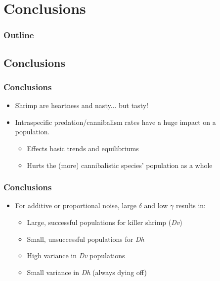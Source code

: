 \section{Conclusions}


\begin{frame}
  \frametitle{Outline}
  \tableofcontents[ currentsection ]
\end{frame}

\subsection{Conclusions}

\begin{frame}
  \frametitle{Conclusions}
\vfill
\begin{itemize}
	\item Shrimp are heartness and nasty... but tasty!
			\vfill
	\item Intraspecific predation/cannibalism rates have a huge impact on a population.
			\vfill
	\begin{itemize}
		\item Effects basic trends and equilibriums
			\vfill
		\item Hurts the (more) cannibalistic species' population as a whole
	\end{itemize}
			\vfill
\end{itemize}
  
\end{frame}

\begin{frame}
  \frametitle{Conclusions}
\vfill

\begin{itemize}
	\item For additive or proportional noise, large $\delta$ and low $\gamma$ results in:
	\begin{itemize}
		\item Large, successful populations for killer shrimp (\textit{Dv})
			\vfill
		\item Small, unsuccessful populations for \textit{Dh}
			\vfill
		\item High variance in \textit{Dv} populations
			\vfill
		\item Small variance in \textit{Dh} (always dying off)
	\end{itemize}
\vfill
\end{itemize}

\end{frame}
